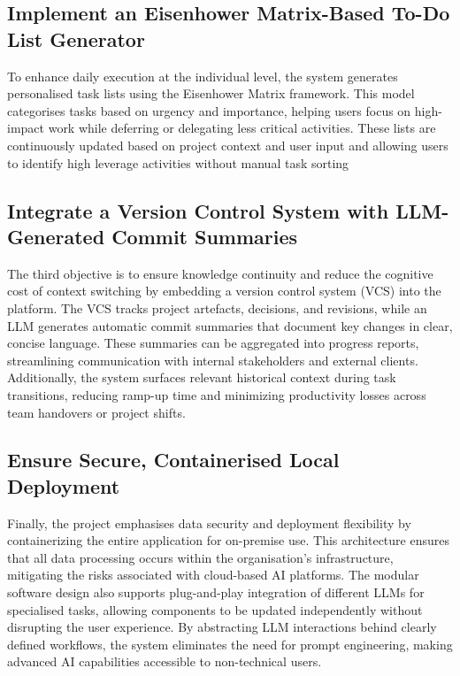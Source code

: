 \documentclass{report}
\begin{document}
\subsection{Implement an Eisenhower Matrix-Based To-Do List Generator}
To enhance daily execution at the individual level, the system generates personalised task lists using the Eisenhower Matrix framework. This model categorises tasks based on urgency and importance, helping users focus on high-impact work while deferring or delegating less critical activities. These lists are continuously updated based on project context and user input and allowing users to identify high leverage activities without manual task sorting
\subsection{Integrate a Version Control System with LLM-Generated Commit Summaries}
The third objective is to ensure knowledge continuity and reduce the cognitive cost of context switching by embedding a version control system (VCS) into the platform. The VCS tracks project artefacts, decisions, and revisions, while an LLM generates automatic commit summaries that document key changes in clear, concise language. These summaries can be aggregated into progress reports, streamlining communication with internal stakeholders and external clients. Additionally, the system surfaces relevant historical context during task transitions, reducing ramp-up time and minimizing productivity losses across team handovers or project shifts.
\subsection{Ensure Secure, Containerised Local Deployment}
Finally, the project emphasises data security and deployment flexibility by containerizing the entire application for on-premise use. This architecture ensures that all data processing occurs within the organisation's infrastructure, mitigating the risks associated with cloud-based AI platforms. The modular software design also supports plug-and-play integration of different LLMs for specialised tasks, allowing components to be updated independently without disrupting the user experience. By abstracting LLM interactions behind clearly defined workflows, the system eliminates the need for prompt engineering, making advanced AI capabilities accessible to non-technical users.
\end{document}
